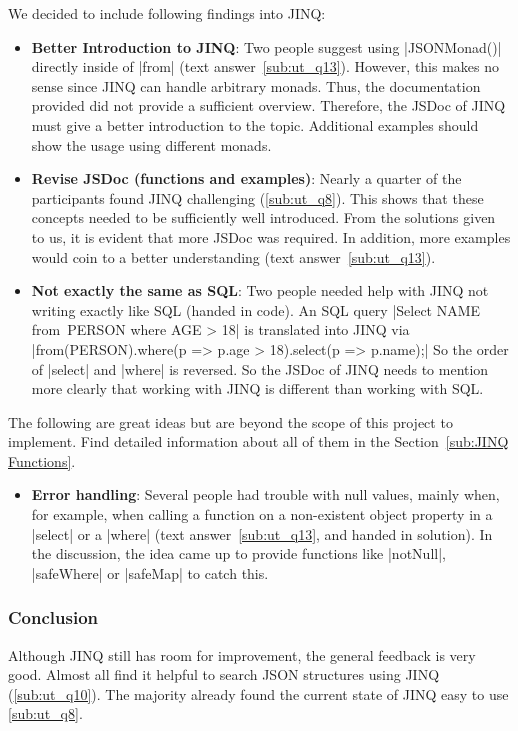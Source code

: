 We decided to include following findings into JINQ:
\begin{itemize}
  \item \textbf{Better Introduction to JINQ}: Two people suggest using
    |JSONMonad()| directly inside of |from| (text answer~\ref{sub:ut_q13}).
    However, this makes no sense since JINQ can handle arbitrary monads. Thus,
    the documentation provided did not provide a sufficient overview.
    Therefore, the JSDoc of JINQ must give a better introduction to the topic.
    Additional examples should show the usage using different monads.
  \item \textbf{Revise JSDoc (functions and examples)}: Nearly a quarter of the participants found JINQ
    challenging (\ref{sub:ut_q8}). This shows that these concepts needed to be
    sufficiently well introduced. From the solutions given to us, it is evident
    that more JSDoc was required. In addition, more examples would coin to a
    better understanding (text answer~\ref{sub:ut_q13}).
    \item \textbf{Not exactly the same as SQL}: Two people needed help with
      JINQ not writing exactly like SQL (handed in code). An SQL query
      |Select NAME from~PERSON where AGE > 18| is translated into JINQ via
      |from(PERSON).where(p => p.age > 18).select(p => p.name);| So the order
      of |select| and |where| is reversed. So the JSDoc of JINQ needs to
      mention more clearly that working with JINQ is different than working
      with SQL.
\end{itemize}

The following are great ideas but are beyond the scope of this project to
implement. Find detailed information about all of them in the
Section~\ref{sub:JINQ Functions}.
\begin{itemize}
  \item \textbf{Error handling}: Several people had trouble with null values,
    mainly when, for example, when calling a  function on a non-existent object
    property in a |select| or a |where| (text answer~\ref{sub:ut_q13}, and
    handed in solution). In the discussion, the idea came up to
    provide functions like |notNull|, |safeWhere| or |safeMap| to catch this.
\end{itemize}
\subsubsection{Conclusion} %
\label{sec:Conclusion}
Although JINQ still has room for improvement, the general feedback is very
good. Almost all find it helpful to search JSON structures using JINQ
(\ref{sub:ut_q10}). The majority already found the current state of JINQ easy
to use \ref{sub:ut_q8}.


